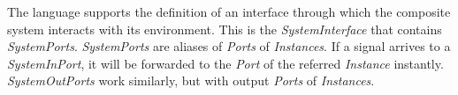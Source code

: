\documentclass[conference]{IEEEtran}
\newcommand{\thetatool}{\textsf{theta}}
\begin{document}
The language supports the definition of an interface through which the composite system interacts with its environment. This is the \textsl{SystemInterface} that contains \textsl{SystemPorts}. \textsl{SystemPorts} are aliases of \textsl{Ports} of  \textsl{Instances}. If a signal arrives to a \textsl{SystemInPort}, it will be forwarded to the \textsl{Port} of the referred \textsl{Instance} instantly. \textsl{SystemOutPorts} work similarly, but with output \textsl{Ports} of \textsl{Instances}. 
%
%	
%	
%	
\end{document}
